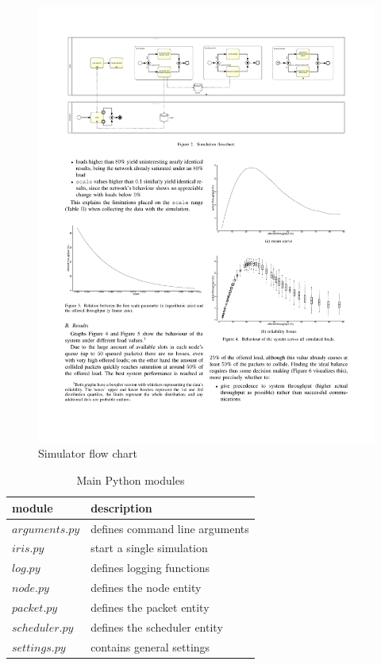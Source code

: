 \documentclass[conference]{IEEEtran}
\begin{document}
\begin{figure}[t]
    \centering
    \includegraphics[width=\textwidth]{graphs/FlowChart}
    \caption{Simulator flow chart}
    \label{fig:flowchart}
\end{figure}

\begin{table}
    \centering
    \caption{Main Python modules}
    \label{tab:mainpythonmodules}
    \begin{tabular}{l|l}
        \toprule
        module & description \\
        \midrule
        \(arguments.py\) & defines command line arguments \\
        \(iris.py\) & start a single simulation \\
        \(log.py\) & defines logging functions \\
        \(node.py\) & defines the node entity \\
        \(packet.py\) & defines the packet entity \\
        \(scheduler.py\) & defines the scheduler entity \\
        \(settings.py\) & contains general settings \\
        \bottomrule
    \end{tabular}
\end{table}
\end{document}

